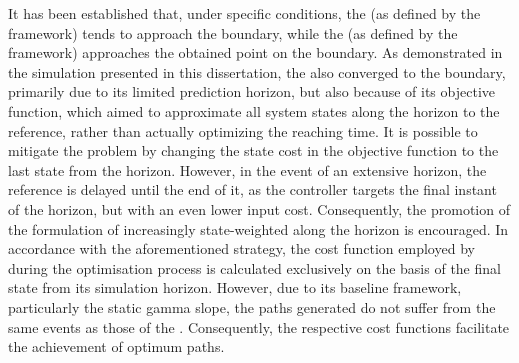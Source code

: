 It has been established that, under specific conditions, the  (as defined by the framework) tends to approach the boundary, while the   (as defined by the framework) approaches the obtained point on the boundary. As demonstrated in the simulation presented in this dissertation, the   also converged to the boundary, primarily due to its limited prediction horizon, but also because of its objective function, which aimed to approximate all system states along the horizon to the reference, rather than actually optimizing the reaching time. It is possible to mitigate the problem by changing the state cost in the objective function to the last state from the horizon. However, in the event of an extensive horizon, the reference is delayed until the end of it, as the controller targets the final instant of the horizon, but with an even lower input cost. Consequently, the promotion of the formulation of increasingly state-weighted along the horizon is encouraged. In accordance with the aforementioned strategy, the cost function employed by   during the optimisation process is calculated exclusively on the basis of the final state from its simulation horizon. However, due to its baseline framework, particularly the static gamma slope, the paths generated   do not suffer from the same events as those of the  . Consequently, the respective cost functions facilitate the achievement of optimum paths.       

